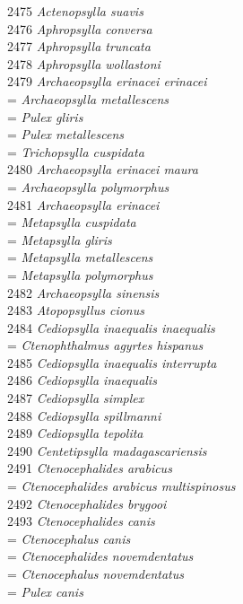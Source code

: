 \documentclass[
]{article}
\begin{document}
2475 \emph{Actenopsylla suavis}\\
2476 \emph{Aphropsylla conversa}\\
2477 \emph{Aphropsylla truncata}\\
2478 \emph{Aphropsylla wollastoni}\\
2479 \emph{Archaeopsylla erinacei erinacei}\\
= \emph{Archaeopsylla metallescens}\\
= \emph{Pulex gliris}\\
= \emph{Pulex metallescens}\\
= \emph{Trichopsylla cuspidata}\\
2480 \emph{Archaeopsylla erinacei maura}\\
= \emph{Archaeopsylla polymorphus}\\
2481 \emph{Archaeopsylla erinacei}\\
= \emph{Metapsylla cuspidata}\\
= \emph{Metapsylla gliris}\\
= \emph{Metapsylla metallescens}\\
= \emph{Metapsylla polymorphus}\\
2482 \emph{Archaeopsylla sinensis}\\
2483 \emph{Atopopsyllus cionus}\\
2484 \emph{Cediopsylla inaequalis inaequalis}\\
= \emph{Ctenophthalmus agyrtes hispanus}\\
2485 \emph{Cediopsylla inaequalis interrupta}\\
2486 \emph{Cediopsylla inaequalis}\\
2487 \emph{Cediopsylla simplex}\\
2488 \emph{Cediopsylla spillmanni}\\
2489 \emph{Cediopsylla tepolita}\\
2490 \emph{Centetipsylla madagascariensis}\\
2491 \emph{Ctenocephalides arabicus}\\
= \emph{Ctenocephalides arabicus multispinosus}\\
2492 \emph{Ctenocephalides brygooi}\\
2493 \emph{Ctenocephalides canis}\\
= \emph{Ctenocephalus canis}\\
= \emph{Ctenocephalides novemdentatus}\\
= \emph{Ctenocephalus novemdentatus}\\
= \emph{Pulex canis}\\
\end{document}
